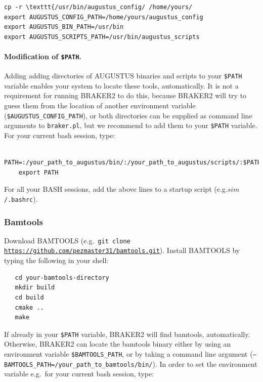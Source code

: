 \documentclass[a4paper,10pt]{report}
\begin{document}
\begin{verbatim}
cp -r \texttt{/usr/bin/augustus_config/ /home/yours/
export AUGUSTUS_CONFIG_PATH=/home/yours/augustus_config
export AUGUSTUS_BIN_PATH=/usr/bin
export AUGUSTUS_SCRIPTS_PATH=/usr/bin/augustus_scripts
\end{verbatim}


   
   \paragraph{Modification of \texttt{\$PATH}.} Adding adding directories of AUGUSTUS binaries and scripts to your \texttt{\$PATH} variable enables your system to locate these tools, automatically. It is not a requirement for running BRAKER2 to do this, because BRAKER2 will try to guess them from the location of another environment variable (\texttt{\$AUGUSTUS\_CONFIG\_PATH}), or both directories can be supplied as command line arguments to \texttt{braker.pl}, but we recommend to add them to your \texttt{\$PATH} variable. For your current bash session, type:

    \begin{verbatim}
    PATH=:/your_path_to_augustus/bin/:/your_path_to_augustus/scripts/:$PATH
    export PATH
    \end{verbatim}

    For all your BASH sessions, add the above lines to a startup script (e.g.\texttt{$sim$/.bashrc}).

   

\subsubsection{Bamtools}

Download BAMTOOLS (e.g.~\texttt{git clone \url{https://github.com/pezmaster31/bamtools.git}}). Install BAMTOOLS by typing the following in your shell:\\

 \begin{verbatim}
   cd your-bamtools-directory
   mkdir build
   cd build
   cmake ..
   make
 \end{verbatim}

 If already in your \texttt{\$PATH} variable, BRAKER2 will find bamtools, automatically. Otherwise, BRAKER2 can locate the bamtools binary either by using an environment variable \texttt{\$BAMTOOLS\_PATH}, or by taking a command line argument (\texttt{--BAMTOOLS\_PATH=/your\_path\_to\_bamtools/bin/}). In order to set the environment variable e.g.~for your current bash session, type:
\end{document}
